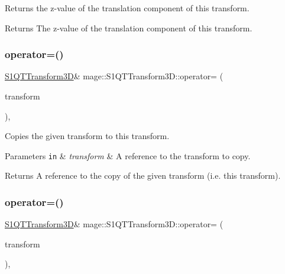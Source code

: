 Returns the z-\/value of the translation component of this transform.

\begin{DoxyReturn}{Returns}
The z-\/value of the translation component of this transform. 
\end{DoxyReturn}
\mbox{\label{classmage_1_1_s1_q_t_transform3_d_ab401cfad943b7079595901546eb52d13}} 
\subsubsection{\texorpdfstring{operator=()}{operator=()}\hspace{0.1cm}{\footnotesize\ttfamily [1/2]}}
{\footnotesize\ttfamily \mbox{\hyperlink{classmage_1_1_s1_q_t_transform3_d}{S1\+Q\+T\+Transform3D}}\& mage\+::\+S1\+Q\+T\+Transform3\+D\+::operator= (\begin{DoxyParamCaption}\item[{const \mbox{\hyperlink{classmage_1_1_s1_q_t_transform3_d}{S1\+Q\+T\+Transform3D}} \&}]{transform }\end{DoxyParamCaption})\hspace{0.3cm}{\ttfamily [default]}, {\ttfamily [noexcept]}}

Copies the given transform to this transform.


\begin{DoxyParams}[1]{Parameters}
\mbox{\tt in}  & {\em transform} & A reference to the transform to copy. \\
\hline
\end{DoxyParams}
\begin{DoxyReturn}{Returns}
A reference to the copy of the given transform (i.\+e. this transform). 
\end{DoxyReturn}
\mbox{\label{classmage_1_1_s1_q_t_transform3_d_af101855b85ae1ed6fb31da03134c965a}} 
\subsubsection{\texorpdfstring{operator=()}{operator=()}\hspace{0.1cm}{\footnotesize\ttfamily [2/2]}}
{\footnotesize\ttfamily \mbox{\hyperlink{classmage_1_1_s1_q_t_transform3_d}{S1\+Q\+T\+Transform3D}}\& mage\+::\+S1\+Q\+T\+Transform3\+D\+::operator= (\begin{DoxyParamCaption}\item[{\mbox{\hyperlink{classmage_1_1_s1_q_t_transform3_d}{S1\+Q\+T\+Transform3D}} \&\&}]{transform }\end{DoxyParamCaption})\hspace{0.3cm}{\ttfamily [default]}, {\ttfamily [noexcept]}}

